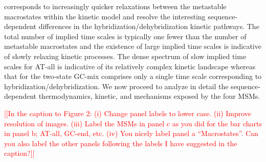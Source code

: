 \documentclass[journal=jpcbfk,manuscript=article]{achemso}
\newcommand*{\noter}[1]{\textcolor{red}{[[#1]]}}		%
\begin{document}
corresponds to increasingly quicker relaxations between the metastable macrostates within the kinetic model and resolve the interesting sequence-dependent differences in the hybridization/dehybridization kinetic pathways. The total number of implied time scales is typically one fewer than the number of metastable macrostates and the existence of large implied time scales is indicative of slowly relaxing kinetic processes. The dense spectrum of slow implied time scales for AT-all is indicative of its relatively complex kinetic landscape whereas that for the two-state GC-mix comprises only a single time scale corresponding to hybridization/dehybridization. We now proceed to analyze in detail the sequence-dependent thermodynamics, kinetic, and mechanisms exposed by the four MSMs.

\noter{In the caption to Figure 2: (i) Change panel labels to lower case. (ii) Improve resolution of images. (iii) Label the MSMs in panel c as you did for the bar charts in panel b; AT-all, GC-end, etc. (iv) You nicely label panel a ``Macrostates''. Can you also label the other panels following the labels I have suggested in the caption?}



\end{document}
